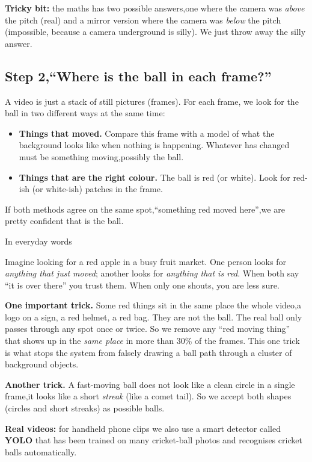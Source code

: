 \documentclass[11pt,a4paper]{article}
\newcommand{\analogy}[1]{%
  \par\vspace{6pt}%
  \noindent
  \colorbox{WarmTint}{%
    \begin{minipage}{\dimexpr\textwidth-2\fboxsep\relax}%
      \color{white}\bfseries\strut In everyday words%
    \end{minipage}%
  }\par\nobreak
  \noindent
  \colorbox{MutedBg}{%
    \begin{minipage}{\dimexpr\textwidth-2\fboxsep\relax}%
      \color{black}\setlength{\parskip}{4pt}\strut #1\strut%
    \end{minipage}%
  }%
  \par\vspace{6pt}%
}
\begin{document}
\textbf{Tricky bit:} the maths has two possible answers,one where the camera was \emph{above} the pitch (real) and a mirror version where the camera was \emph{below} the pitch (impossible, because a camera underground is silly). We just throw away the silly answer.

\subsection{Step 2,``Where is the ball in each frame?''}

A video is just a stack of still pictures (frames). For each frame, we look for the ball in two different ways at the same time:

\begin{itemize}
    \item \textbf{Things that moved.} Compare this frame with a model of what the background looks like when nothing is happening. Whatever has changed must be something moving,possibly the ball.
    \item \textbf{Things that are the right colour.} The ball is red (or white). Look for red-ish (or white-ish) patches in the frame.
\end{itemize}

If both methods agree on the same spot,``something red moved here'',we are pretty confident that is the ball.

\analogy{Imagine looking for a red apple in a busy fruit market. One person looks for \emph{anything that just moved}; another looks for \emph{anything that is red}. When both say ``it is over there'' you trust them. When only one shouts, you are less sure.}

\textbf{One important trick.} Some red things sit in the same place the whole video,a logo on a sign, a red helmet, a red bag. They are not the ball. The real ball only passes through any spot once or twice. So we remove any ``red moving thing'' that shows up in the \emph{same place} in more than 30\% of the frames. This one trick is what stops the system from falsely drawing a ball path through a cluster of background objects.

\textbf{Another trick.} A fast-moving ball does not look like a clean circle in a single frame,it looks like a short \emph{streak} (like a comet tail). So we accept both shapes (circles and short streaks) as possible balls.

\textbf{Real videos:} for handheld phone clips we also use a smart detector called \textbf{YOLO} that has been trained on many cricket-ball photos and recognises cricket balls automatically.
\end{document}
